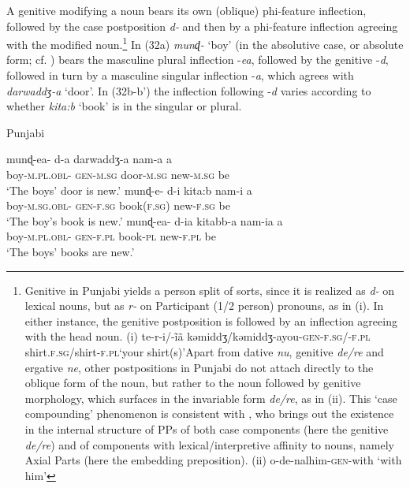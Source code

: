 \documentclass[output=paper]{langsci/langscibook}
\begin{document}
A genitive modifying a noun bears its own (oblique) phi-feature inflection, followed by the case postposition \textit{d-} and then by a phi-feature inflection agreeing with the modified noun.\footnote{Genitive in Punjabi yields a person split of sorts, since it is realized as \textit{d-} on lexical nouns, but as \textit{r-} on Participant (1\slash 2 person) pronouns, as in (i). In either instance, the genitive postposition is followed by an inflection agreeing with the head noun. (i)    te-r-i/-ĩã    kəmiddʒ/kəmiddʒ-ayou-\textsc{gen-f.sg/-f.pl}  shirt.\textsc{f.sg}/shirt-\textsc{f.pl}‘your shirt(s)’Apart from dative \textit{nu}, genitive \textit{de\slash re} and ergative \textit{ne}, other postpositions in Punjabi do not attach directly to the oblique form of the noun, but rather to the noun followed by genitive morphology, which surfaces in the invariable form \textit{de\slash re}, as in (ii). This ‘case compounding’ phenomenon is consistent with \citet{Svenonius2006}, who brings out the existence in the internal structure of PPs of both case components (here the genitive \textit{de\slash re}) and of components with lexical\slash interpretive affinity to nouns, namely Axial Parts (here the embedding preposition). (ii)    o-de-nalhim-\textsc{gen}{}-with   ‘with him’} In (32a) \textit{munɖ-} ‘boy’ (in the absolutive case, or absolute form; cf. \citealt{Bailey1904}) bears the masculine plural inflection -\textit{ea}, followed by the genitive -\textit{d}, followed in turn by a masculine singular inflection -\textit{a}, which agrees with \textit{darwaddʒ-a} ‘door’. In (32b-b’) the inflection following -\textit{d} varies according to whether \textit{kita:b} ‘book’ is in the singular or plural. 

\ea%
    Punjabi\label{ex:manzini:32}\\
    \begin{xlista}
    \ex
    \gll munɖ-ea-    d-a     darwaddʒ-a   nam-a   a\\
         boy-\textsc{m.pl.obl-}  \textsc{gen-m.sg}  door-\textsc{m.sg}  new-\textsc{m.sg}    be\\
    \glt ‘The boys’ door is new.’
    \ex  
    \gll munɖ-e-    d-i     kita:b     nam-i     a\\
         boy-\textsc{m.sg.obl-}  \textsc{gen-f.sg}   book(\textsc{f.sg)}   new-\textsc{f.sg}   be\\
    \glt ‘The boy’s book is new.’
    \gll munɖ-ea-    d-ia     kitabb-a   nam-ia   a\\
         boy-\textsc{m.pl.obl-}  \textsc{gen-f.pl}   book-\textsc{pl}   new-\textsc{f.pl}   be\\
    \glt ‘The boys’ books are new.’ 
    \end{xlista}
    \z
\end{document}
